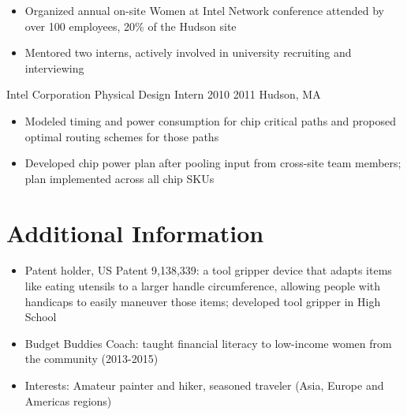 \documentclass[a4paper,11pt]{business}
\begin{document}
{\begin{itemize}
  \item Organized annual on-site Women at Intel Network conference attended by over 100 employees, 20\% of the Hudson site
  \item Mentored two interns, actively involved in university recruiting and interviewing
 \end{itemize}
}

\entry
 {Intel Corporation}
 {Physical Design Intern}
 {2010}
 {2011}
 {Hudson, MA}{
 \begin{itemize}
  \item Modeled timing and power consumption for chip critical paths and proposed optimal routing schemes for those paths
  \item Developed chip power plan after pooling input from cross-site team members; plan implemented across all chip SKUs
 \end{itemize}
} 


\section{Additional Information}

\begin{itemize}
 \item Patent holder, US Patent 9,138,339: a tool gripper device that adapts items like eating utensils to a larger handle circumference, allowing people with handicaps to easily maneuver those items; developed tool gripper in High School
 \item Budget Buddies Coach: taught financial literacy to low-income women from the community (2013-2015)
 \item Interests: Amateur painter and hiker, seasoned traveler (Asia, Europe and Americas regions)
\end{itemize}
\end{document}
